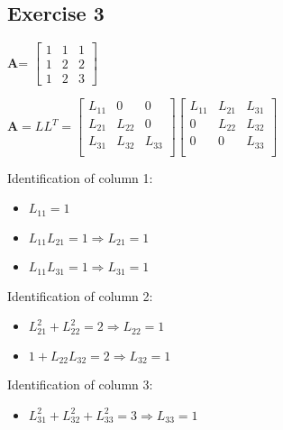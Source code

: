 \documentclass[12pt]{article}
\begin{document}
\subsection{Exercise 3}

\begin{center}
\textbf{A}=
$\begin{bmatrix}
1&1&1\\
1&2&2\\
1&2&3
\end{bmatrix}
$
\end{center}

\begin{center}
$\textbf{A}= LL^T =
\begin{bmatrix}
L_{11}&0&0\\
L_{21}&L_{22}&0\\
L_{31}&L_{32}&L_{33}\\
\end{bmatrix}
\begin{bmatrix}
L_{11}&L_{21}&L_{31}\\
0&L_{22}&L_{32}\\
0&0&L_{33}\\
\end{bmatrix}
$
\end{center}

Identification of column 1:
\begin{itemize}
\item $L_{11} = 1$
\item $L_{11}L_{21} = 1 \Rightarrow L_{21} = 1$
\item $L_{11}L_{31} = 1 \Rightarrow L_{31} = 1$
\end{itemize}

Identification of column 2:
\begin{itemize}
\item $L_{21}^2 + L_{22}^2 = 2 \Rightarrow L_{22} = 1$
\item $1+L_{22}L_{32} = 2 \Rightarrow L_{32} = 1$
\end{itemize}

Identification of column 3:
\begin{itemize}
\item $L_{31}^2 + L_{32}^2  + L_{33}^2 = 3 \Rightarrow L_{33} = 1$
\end{itemize}
\end{document}
